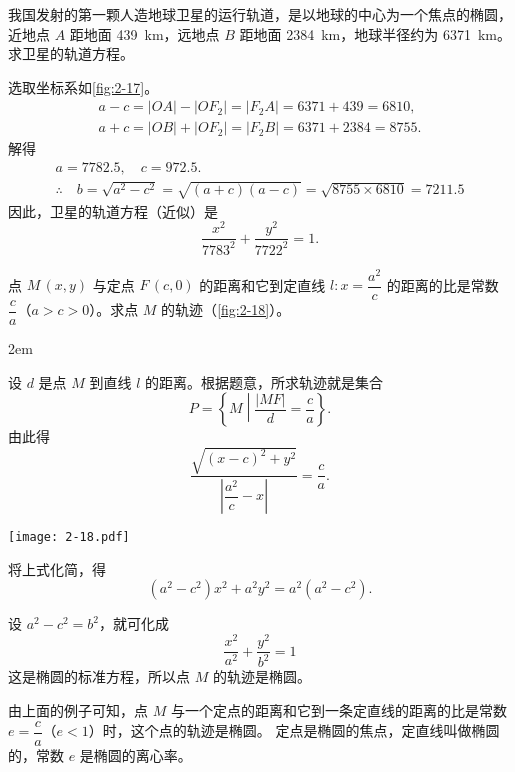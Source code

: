 \begin{example}
我国发射的第一颗人造地球卫星的运行轨道，是以地球的中心为一个焦点的椭圆，近地点 $A$ 距地面 \qty{439}{km}，远地点 $B$ 距地面 \qty{2384}{km}，地球半径约为 \qty{6371}{km}。求卫星的轨道方程。
\end{example}
\begin{solution}
  选取坐标系如\cref{fig:2-17}。
  \begin{gather*}
    a-c=|OA|-|OF_2|=|F_2A|=6371+439=6810,\\
    a+c=|OB|+|OF_2|=|F_2B|=6371+2384=8755.
  \end{gather*}
  解得
  \begin{gather*}
    a=7782.5,\quad c=972.5.\\
    \therefore \quad b=\sqrt{a^2-c^2} = \sqrt{(a+c)(a-c)} = \sqrt{8755\times 6810}= 7211.5
  \end{gather*}
  因此，卫星的轨道方程（近似）是
  \[ \frac{x^2}{7783^2}+\frac{y^2}{7722^2} = 1.\]
\end{solution}

\begin{example}
  点 $M\,(x,y)$ 与定点 $F\,(c,0)$ 的距离和它到定直线 $l:x=\dfrac{a^2}{c}$ 的距离的比是常数 $\dfrac{c}{a}$（$a>c>0$）。求点 $M$ 的轨迹（\cref{fig:2-18}）。
\end{example}

\noindent
\begin{minipage}{0.55\linewidth}\parindent2em
\begin{solution}
  设 $d$ 是点 $M$ 到直线 $l$ 的距离。根据题意，所求轨迹就是集合
  \[P=\left\{ M \middle\vert \frac{|MF|}{d}=\frac{c}{a} \right\}.\]
  由此得
  \[\frac{\sqrt{(x-c)^2+y^2}}{\left|\dfrac{a^2}{c}-x\right|}=\frac{c}{a}.\]
\end{solution}
\end{minipage}\hfill
\begin{minipage}{0.4\linewidth}\centering
  \begin{figurehere}
    \texttt{[image: 2-18.pdf]}
    \caption{}\label{fig:2-18}
  \end{figurehere}
\end{minipage}

\medskip\noindent
将上式化简，得
  \[(a^2-c^2)x^2+a^2y^2=a^2(a^2-c^2).\]

  设 $a^2-c^2=b^2$，就可化成
  \[ \frac{x^2}{a^2}+\frac{y^2}{b^2}=1\]
这是椭圆的标准方程，所以点 $M$ 的轨迹是椭圆。

由上面的例子可知，点 $M$ 与一个定点的距离和它到一条定直线的距离的比是常数 $e= \dfrac{c}{a}$（$e<1$）时，这个点的轨迹是椭圆。
定点是椭圆的焦点，定直线叫做椭圆的，常数 $e$ 是椭圆的离心率。

